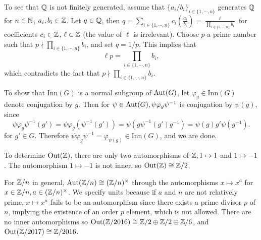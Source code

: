 \begin{ex}
    To see that $\mathbb{Q}$ is not finitely generated, assume that $\{a_i  /b_i \} _{i \in \{1,\cdots ,n\} }$ generates $\mathbb{Q}$ for $n \in \mathbb{N}$, $a_i ,b_i  \in \mathbb{Z}$. Let $q \in \mathbb{Q}$, then $q= \sum _{i \in \{1,\cdots ,n\} }c_i \left( \frac{a_i }{b_i } \right)= \frac{\ell}{\prod _{i \in \{1,\cdots ,n\} }b_i }  $ for coefficients $c_i \in \mathbb{Z}$, $\ell \in \mathbb{Z}$ (the value of $\ell$ is irrelevant). Choose $p$ a prime number such that $p \nmid \prod _{i \in \{1,\cdots ,n\} }b_i $, and set $q=1/p$. This implies that \[
\ell p = \prod _{i \in \{1,\cdots ,n\} }b_i ,
    \] which contradicts the fact that $p\nmid \prod _{i \in \{1,\cdots ,n\} }b_i $.
\end{ex}
\begin{ex}
    To show that $\mathrm{Inn}(G)$ is a normal subgroup of $\mathrm{Aut} (G)$, let  $\varphi _g \in \mathrm{Inn}(G)$ denote conjugation by $g$. Then for $\psi \in \mathrm{Aut}(G), \psi \varphi _g \psi ^{-1}$ is conjugation by $\psi(g)$, since \[
        \psi \varphi _g\psi ^{-1}(g')=\psi\varphi _g (\psi ^{-1}(g'))= \psi\left( g \psi ^{-1}(g') g^{-1} \right) =\psi(g) g' \psi (g^{-1}).
    \] for $g' \in G$. Therefore $\psi \varphi _g \psi ^{-1} = \varphi  _{\psi(g)} \in \mathrm{Inn}(G)$, and we are done. 

    To determine $\mathrm{Out}(\mathbb{Z})$, there are only two automorphisms of $\mathbb{Z}; 1 \mapsto 1$ and $1 \mapsto  -1$. The automorphism $1 \mapsto -1$ is not inner, so $\mathrm{Out}(\mathbb{Z}) \cong  \mathbb{Z} /2$.

For $\mathbb{Z} / n$ in general, $\mathrm{Aut}(\mathbb{Z} / n) \cong (\mathbb{Z} / n ) ^{\times }$ through the automorphisms $x \mapsto  x^a$ for $x \in \mathbb{Z} / n, a \in (\mathbb{Z} /n) ^{\times }$. We specify units because if $a$ and $n$ are not relatively prime, $x \mapsto x^a$ fails to be an automorphism since there exists a prime divisor $p$ of $n$, implying the existence of an order $p$ element, which is not allowed. There are no inner automorphisms so $\mathrm{Out}(\mathbb{Z} /2016)\cong \mathbb{Z}/2 \oplus \mathbb{Z}/2 \oplus \mathbb{Z}/6$, and $\mathrm{Out}(\mathbb{Z} / 2017) \cong \mathbb{Z}/2016$.
\end{ex}

